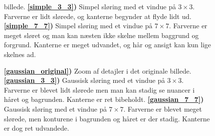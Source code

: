 {\begin{figure}[!h]
{        billede.
        \textbf{\ref{simple_3_3})} Simpel sløring med et vindue på $3\times{}3$.
        Farverne er lidt slørede, og kanterne begynder at flyde lidt ud.
        \textbf{\ref{simple_7_7})} Simpel sløring med et vindue på $7\times{}7$.
        Farverne er meget sløret og man kan næsten ikke skelne mellem
        baggrund og forgrund. Kanterne er meget udvandet, og hår og
        ansigt kan kun lige skelnes ad.
    }
    \label{simple_metode}
\end{figure}
\begin{figure}[!h]
    \centering
    \hspace{1em}
    \hspace{1em}
    \caption[]{
        \textbf{\ref{gaussian_original})} Zoom af detajler i det originale billede.
        \textbf{\ref{gaussian_3_3})} Gaussisk sløring med et vindue på
        $3\times{}3$. Farverne er blevet lidt slørede men man kan stadig se
        nuancer i håret og bagrunden. Kanterne er ret bibeholdt.
        \textbf{\ref{gaussian_7_7})} Gaussisk sløring med et vindue på
        $7\times{}7$. Farverne er blevet meget slørede, men konturene i
        bagrunden og håret er der stadig. Kanterne er dog ret udvandede.
    }
    \label{gaussian_metode}
\end{figure}

}
